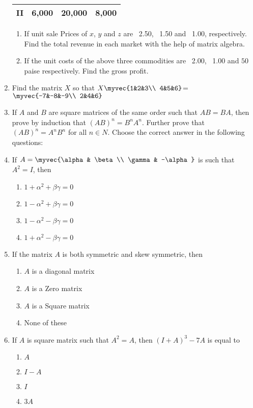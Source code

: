 \begin{enumerate}
\begin{table}
\begin{tabular}{|c|c|c|c|}
\hline
II &6,000 &20,000 &8,000\\
\hline
\end{tabular}
\caption{}
\end{table}
\begin{enumerate}
\item If unit sale Prices of $x$, $y$ and $z$ are \rupee~2.50, \rupee~1.50 and \rupee~1.00, respectively. Find the total revenue in each market with the help of matrix algebra.
\item If the unit costs of the above three commodities are \rupee~2.00, \rupee~1.00 and $50$ paise respectively. Find the gross profit.
\end{enumerate}
\item Find the matrix $X$ so that $X\myvec{1&2&3\\ 4&5&6}$= $\myvec{-7&-8&-9\\ 2&4&6}$
\item If $A$ and $B$ are square matrices of the same order such that $AB=BA$, then prove by induction that $(AB)^n=B^nA^n$. Further prove that $(AB)^n=A^nB^n$ for all $n \in N$. Choose the correct answer in the following questions:
\item If $A=\myvec{\alpha& \beta \\ \gamma& -\alpha}$ is such that $A^2= I$, then
\begin{enumerate} 
\item $1+ \alpha^2+ \beta \gamma=0$
\item $1-\alpha^2+ \beta \gamma=0$
\item $1-\alpha^2- \beta \gamma=0$
\item $1+\alpha^2- \beta \gamma=0$ 
\end{enumerate}
\item If the matrix $A$ is both symmetric and skew symmetric, then
\begin{enumerate}
\item $A$ is a diagonal matrix
\item $A$ is a Zero matrix
\item $A$ is a Square matrix
\item None of these
\end{enumerate}
\item If $A$ is square matrix such that $A^2=A$, then $(I+A)^3-7A$ is equal to
\begin{enumerate}
\item $A$
\item $I-A$
\item $I$
\item $3A$
\end{enumerate}
\end{enumerate}

